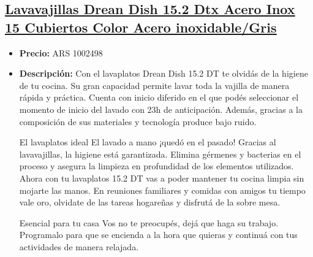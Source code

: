 \documentclass{article}
\begin{document}
\begin{adjustwidth}{2em}{}

\subsection{\uline{\href{https://www.mercadolibre.com.ar/lavavajillas-drean-dish-152-dtx-acero-inox-15-cubiertos-color-acero-inoxidablegris/p/MLA12187952}{Lavavajillas Drean Dish 15.2 Dtx Acero Inox 15 Cubiertos Color Acero inoxidable/Gris}}}
\begin{itemize}
    \item \textbf{Precio:} ARS 1002498
    \item \textbf{Descripción:} Con el lavaplatos Drean Dish 15.2 DT te olvidás de la higiene de tu cocina. Su gran capacidad permite lavar toda la vajilla de manera rápida y práctica. Cuenta con inicio diferido en el que podés seleccionar el momento de inicio del lavado con 23h de anticipación. Además, gracias a la composición de sus materiales y tecnología produce bajo ruido.

El lavaplatos ideal
El lavado a mano ¡quedó en el pasado! Gracias al lavavajillas,  la higiene está garantizada. Elimina gérmenes y bacterias en el proceso y asegura la limpieza en profundidad de los elementos utilizados. Ahora con tu lavaplatos 15.2 DT vas a poder mantener tu cocina limpia sin mojarte las manos. En reuniones familiares y comidas con amigos tu tiempo vale oro, olvidate de las tareas hogareñas y disfrutá de la sobre mesa.

Esencial para tu casa
Vos no te preocupés, dejá que haga su trabajo. Programalo para que se encienda a la hora que quieras y continuá con tus actividades de manera relajada.


\end{itemize}
\end{adjustwidth}
\end{document}
